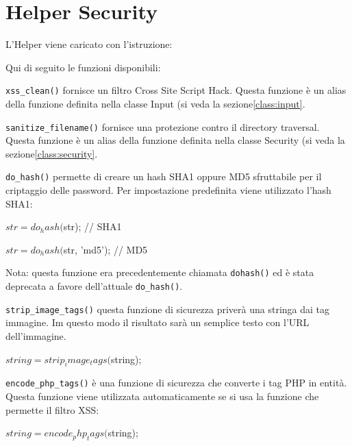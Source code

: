 \section{Helper Security}
\label{helper:security}
L'Helper viene caricato con l'istruzione:


Qui di seguito le funzioni disponibili:

\verb|xss_clean()| fornisce un filtro Cross Site Script Hack. Questa funzione è un alias della funzione definita nella classe Input (si veda la sezione\vref{class:input}.

\verb|sanitize_filename()| fornisce una protezione contro il directory traversal. Questa funzione è un alias della funzione definita nella classe Security (si veda la sezione\vref{class:security}. 

\verb|do_hash()| permette di creare un hash SHA1 oppure MD5 sfruttabile per il criptaggio delle password. Per impostazione predefinita viene utilizzato l'hash SHA1:

\begin{code}
$str = do_hash($str); // SHA1

$str = do_hash($str, 'md5'); // MD5
\end{code}

Nota: questa funzione era precedentemente chiamata \verb|dohash()| ed è stata deprecata a favore dell'attuale \verb|do_hash()|.

\verb|strip_image_tags()| questa funzione di sicurezza priverà una stringa dai tag immagine. Im questo modo il risultato sarà un semplice testo con l'URL dell'immagine.

\begin{code}
$string = strip_image_tags($string);
\end{code}

\verb|encode_php_tags()| è una funzione di sicurezza che converte i tag PHP in entità. Questa funzione viene utilizzata automaticamente se si usa la funzione che permette il filtro XSS:

\begin{code}
$string = encode_php_tags($string);
\end{code}